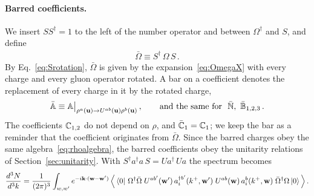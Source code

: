 \paragraph{Barred coefficients.} We insert $SS^\dagger=1$ to the left of the number operator and between $\Omega^\dagger$ and $S$, and define
\begin{align}\label{eq:Omegabar}
\bar\Omega\equiv S^\dagger\,\Omega\,S\,.
\end{align}
By Eq.~\eqref{eq:Srotation}, $\bar\Omega$ is given by the expansion~\eqref{eq:OmegaX} with every charge and every gluon operator rotated. A bar on a coefficient denotes the replacement of every charge in it by the rotated charge,
\begin{align}\label{eq:bar}
\bar{\mathbb{A}}\equiv\mathbb{A}\big|_{\rho^a(\mathbf{u})\to U^{ab}(\mathbf{u})\rho^b(\mathbf{u})}\,,\qquad\text{and the same for }\ \bar{\mathbb{N}},\ \bar{\mathbb{B}}_{1,2,3}\,.
\end{align}
The coefficients $\mathbb{C}_{1,2}$ do not depend on $\rho$, and $\bar{\mathbb{C}}_{1}=\mathbb{C}_1$; we keep the bar as a reminder that the coefficient originates from $\bar\Omega$. Since the barred charges obey the same algebra~\eqref{eq:rhoalgebra}, the barred coefficients obey the unitarity relations of Section~\ref{sec:unitarity}. With $S^\dagger a^\dagger a\,S=Ua^\dagger\,Ua$ the spectrum becomes
\begin{align}\label{eq:observable2}
\frac{d^3N}{d^3k}=\frac{1}{(2\pi)^3}\int_{w,w'}e^{-i\mathbf{k}\cdot(\mathbf{w}-\mathbf{w}')}\,\Big\langle\bra0\,\Omega^\dagger\bar\Omega\;U^{ab'}(\mathbf{w}')\,a^{\dagger b'}_i(k^+,\mathbf{w}')\;U^{ab}(\mathbf{w})\,a^b_i(k^+,\mathbf{w})\;\bar\Omega^\dagger\Omega\ket0\Big\rangle\,.
\end{align}


